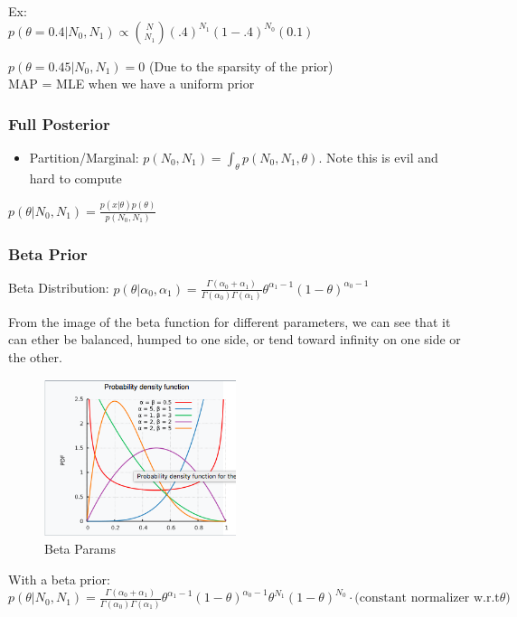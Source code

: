 \documentclass{article}
\begin{document}
Ex:\\
$p(\theta=0.4|N_0,N_1) \propto {N \choose N_1} (.4)^{N_1}(1-.4)^{N_0} (0.1)$

$p(\theta=0.45|N_0,N_1) = 0 $ (Due to the sparsity of the prior)\\

MAP = MLE when we have a uniform prior

\subsubsection*{Full Posterior}

\begin{itemize}
\item Partition/Marginal: $p(N_0,N_1) = \int_\theta p(N_0,N_1,\theta)$. Note this is evil and hard to compute
\end{itemize}
$p(\theta|N_0,N_1) = \frac{p(x|\theta) p(\theta)}{p(N_0,N_1)}$

\subsubsection*{Beta Prior}

Beta Distribution: $p(\theta|\alpha_0,\alpha_1) = \frac{\Gamma(\alpha_0 + \alpha_1)}{\Gamma(\alpha_0)\Gamma(\alpha_1)} \theta^{\alpha_1-1} (1-\theta)^{\alpha_0-1}$ 

From the image of the beta function for different parameters, we can see that it can ether be balanced, humped to one side, or tend toward infinity on one side or the other.
\begin{figure}
\centering
\includegraphics[width=0.5\textwidth]{./beta.png}
\caption{Beta Params}
\end{figure}

With a beta prior:  $p(\theta|N_0,N_1) = \frac{\Gamma(\alpha_0 + \alpha_1)}{\Gamma(\alpha_0)\Gamma(\alpha_1)} \theta^{\alpha_1-1} (1-\theta)^{\alpha_0-1} \theta^{N_1}(1-\theta)^{N_0} \cdot \textrm{(constant normalizer w.r.t} \theta) $
\end{document}
